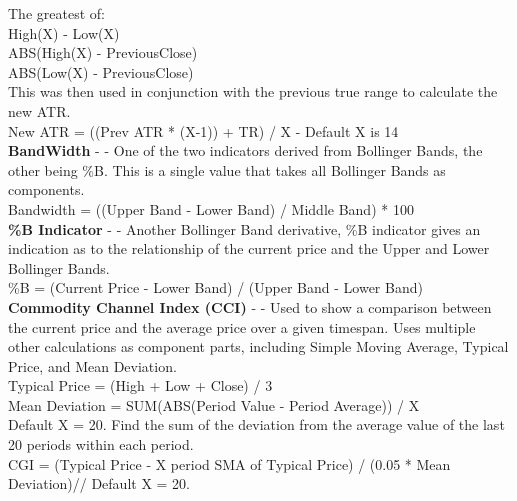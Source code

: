 \documentclass[conference]{IEEEtran}
\begin{document}
\noindent
The greatest of:\\
High(X) - Low(X)\\
ABS(High(X) - PreviousClose)\\
ABS(Low(X) - PreviousClose)\\

\noindent
This was then used in conjunction with the previous true range to calculate the new ATR.\\

\noindent
New ATR = ((Prev ATR * (X-1)) + TR) / X - Default X is 14 \\

\noindent
\textbf{BandWidth} - \cite{Murphy1999} - One of the two indicators derived from Bollinger Bands, the other being \%B. This is a single value that takes all Bollinger Bands as components.\\
\noindent
Bandwidth = ((Upper Band - Lower Band) / Middle Band) * 100 \\

\noindent
\textbf{\%B Indicator} - \cite{Murphy1999} - Another Bollinger Band derivative, \%B indicator gives an indication as to the relationship of the current price and the Upper and Lower Bollinger Bands. \\
\noindent
\%B = (Current Price - Lower Band) / (Upper Band - Lower Band)\\

\noindent
\textbf{Commodity Channel Index (CCI)} - \cite{Lambert1980} - Used to show a comparison between the current price and the average price over a given timespan. Uses multiple other calculations as component parts, including Simple Moving Average, Typical Price, and Mean Deviation.\\

\noindent
Typical Price = (High + Low + Close) / 3\\

\noindent
Mean Deviation = SUM(ABS(Period Value - Period Average)) / X\\
Default X = 20. Find the sum of the deviation from the average value of the last 20 periods within each period. \\

\noindent
CGI = (Typical Price - X period SMA of Typical Price) / (0.05 * Mean Deviation)//
Default X = 20.\\
\end{document}
